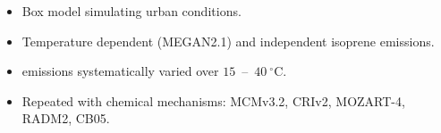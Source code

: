 \begin{BlueBox}
    \vskip-1cm
    \begin{block}{}
        \begin{itemize} 
            \item Box model simulating urban conditions. \vspace{9mm}
            \item Temperature dependent (MEGAN2.1) and independent isoprene emissions. \vspace{9mm}
            \item {} emissions systematically varied over \mbox{$15$ -- $40~^{\circ}$C}. \vspace{9mm}
            \item Repeated with chemical mechanisms: MCMv3.2, CRIv2, MOZART-4, \\ RADM2, CB05. \vspace{9mm}
        \end{itemize}
    \end{block}
\end{BlueBox}
